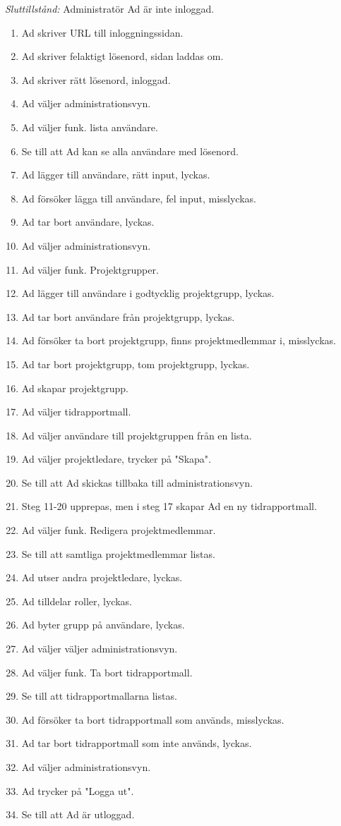 \documentclass[a4paper]{article}
\begin{document}
\begin{ST}
\emph{Sluttillstånd:} Administratör Ad är inte inloggad.

\begin{enumerate}
\item Ad skriver URL till inloggningssidan.
\item Ad skriver felaktigt lösenord, sidan laddas om.
\item Ad skriver rätt lösenord, inloggad.
\item Ad väljer administrationsvyn.
\item Ad väljer funk. lista användare.
\item Se till att Ad kan se alla användare med lösenord.
\item Ad lägger till användare, rätt input, lyckas.
\item Ad försöker lägga till användare, fel input, misslyckas.
\item Ad tar bort användare, lyckas.
\item Ad väljer administrationsvyn.
\item Ad väljer funk. Projektgrupper.
\item Ad lägger till användare i godtycklig projektgrupp, lyckas.
\item Ad tar bort användare från projektgrupp, lyckas.
\item Ad försöker ta bort projektgrupp, finns projektmedlemmar i, misslyckas.
\item Ad tar bort projektgrupp, tom projektgrupp, lyckas.
\item Ad skapar projektgrupp.
\item Ad väljer tidrapportmall.
\item Ad väljer användare till projektgruppen från en lista.
\item Ad väljer projektledare, trycker på "Skapa".
\item Se till att Ad skickas tillbaka till administrationsvyn.
\item Steg 11-20 upprepas, men i steg 17 skapar Ad en ny tidrapportmall.
\item Ad väljer funk. Redigera projektmedlemmar.
\item Se till att samtliga projektmedlemmar listas.
\item Ad utser andra projektledare, lyckas.
\item Ad tilldelar roller, lyckas.
\item Ad byter grupp på användare, lyckas.
\item Ad väljer väljer administrationsvyn.
\item Ad väljer funk. Ta bort tidrapportmall.
\item Se till att tidrapportmallarna listas.
\item Ad försöker ta bort tidrapportmall som används, misslyckas.
\item Ad tar bort tidrapportmall som inte används, lyckas.
\item Ad väljer administrationsvyn.
\item Ad trycker på "Logga ut".
\item Se till att Ad är utloggad.
\end{enumerate}

\end{ST}
\end{document}
